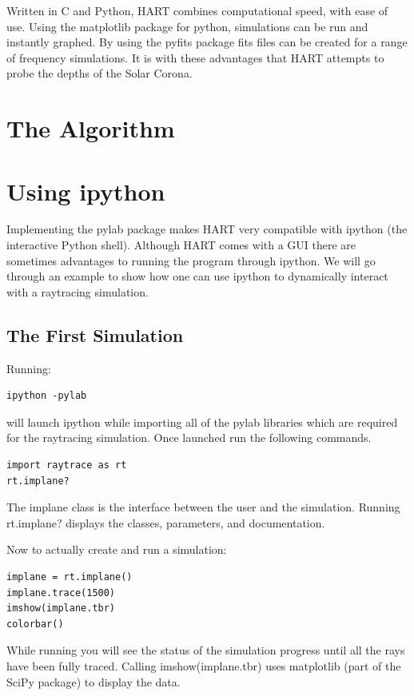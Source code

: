 \documentclass[12pt]{article}
\begin{document}
Written in C and Python, HART combines computational speed, with ease
of use. Using the matplotlib package for python, simulations can be
run and instantly graphed. By using the pyfits package fits files
can be created for a range of frequency simulations. It is with these
advantages that HART attempts to probe the depths of the Solar Corona.



\section{The Algorithm}

\section{Using ipython}
Implementing the pylab package makes HART very compatible with ipython
(the interactive Python shell). Although HART comes with a GUI there
are sometimes advantages to running the program through ipython. We
will go through an example to show how one can use ipython to
dynamically interact with a raytracing simulation. 
\subsection{The First Simulation}


Running:
\begin{lstlisting}
ipython -pylab
\end{lstlisting}
will launch ipython while importing all of the pylab libraries which
are required for the raytracing simulation. Once launched run the
following commands.
\lstset{language=python}
\begin{lstlisting}
import raytrace as rt
rt.implane?
\end{lstlisting}
The implane class is the interface between the user and the
simulation. Running rt.implane? displays the classes, parameters, and
documentation. 


Now to actually create and run a simulation:
\begin{lstlisting}
implane = rt.implane()
implane.trace(1500)
imshow(implane.tbr)
colorbar()
\end{lstlisting}
While running you will see the status of the simulation progress until
all the rays have been fully traced. Calling imshow(implane.tbr) uses
matplotlib (part of the SciPy package) to display the data.
\end{document}
